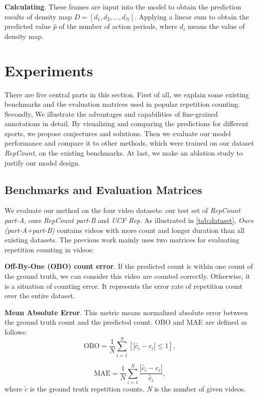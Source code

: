 \documentclass[10pt,twocolumn,letterpaper]{article}
\begin{document}
\noindent \textbf{Calculating}.
These frames are input into the model to obtain the prediction results of density map $D=[d_1,d_2,\dots,d_N]$. Applying a linear sum to obtain the predicted value $\hat{p}$ of the number of action periods, where $d_i$ means the value of density map.

\section{Experiments}
\label{sec:experiment}


 There are five central parts in this section. First of all, we explain some existing benchmarks and the evaluation matrices used in popular repetition counting. Secondly, We illustrate the advantages and capabilities of fine-grained annotations in detail. By visualizing and comparing the predictions for different sports, we propose conjectures and solutions. Then we evaluate our model performance and compare it to other methods, which were trained on our dataset \emph{RepCount}, on the existing benchmarks. At last, we make an ablation study to justify our model design.

\subsection{Benchmarks and Evaluation Matrices}
We evaluate our method on the four video datasets: our test set of \emph{RepCount part-A}, ours \emph{RepCount part-B} and \emph{UCF Rep}\cite{Zhang_2020_CVPR}. As illustrated in \cref{tab:dataset}, \emph{ Ours (part-A+part-B)} contains videos with more count and longer duration than all  existing datasets. The previous work\cite{RepNet, Zhang_2020_CVPR} mainly uses two  matrices for evaluating repetition counting in videos:

\noindent \textbf{Off-By-One (OBO) count error}. If the predicted count is within one count of the ground truth, we can consider this video are counted correctly. Otherwise, it is a situation of counting error. It represents the error rate of repetition count over the entire dataset.

\noindent \textbf{Mean Absolute Error}. This metric means normalized absolute error between the ground truth count and the predicted count.
OBO and MAE are defined as follows:
\begin{equation}
\text{OBO}=\frac{1}{N}\sum_{i=1}^{N}[| \widetilde{c_i} - {c_i}|\leq{1}],
\end{equation}

\begin{equation}
\text{MAE}=\frac{1}{N} \sum_{i=1}^{N}\frac{|\widetilde{c_i}-{c_i}|}{\widetilde{c_i}},
\end{equation} 
where $\widetilde{c} $ is the ground truth repetition counts. \emph{N} is the number of given videos.
\end{document}
